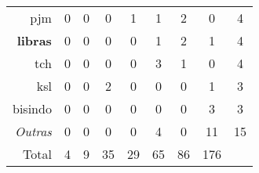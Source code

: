 \begin{table}[]
{\begin{tabular}{r|ccccccc|c}
        \acrshort{pjm}             & 0                         & 0                         & 0                          & \cellcolor[HTML]{FFFEFB}1  & \cellcolor[HTML]{FFFEFB}1  & \cellcolor[HTML]{FFFCF6}2  & 0                          & 4     \\
        \textbf{\acrshort{libras}} & 0                         & 0                         & 0                          & 0                          & \cellcolor[HTML]{FFFEFB}1  & \cellcolor[HTML]{FFFCF6}2  & \cellcolor[HTML]{FFFEFB}1  & 4     \\
        \acrshort{tch}             & 0                         & 0                         & 0                          & 0                          & \cellcolor[HTML]{FFFBF2}3  & 1                          & 0                          & 4     \\
        \acrshort{ksl}             & 0                         & 0                         & \cellcolor[HTML]{FFFCF6}2  & 0                          & 0                          & 0                          & \cellcolor[HTML]{FFFEFB}1  & 3     \\
        \acrshort{bisindo}         & 0                         & 0                         & 0                          & 0                          & 0                          & 0                          & \cellcolor[HTML]{FFFBF2}3  & 3     \\
        \textit{Outras}                             & 0                         & 0                         & 0                          & 0                          & \cellcolor[HTML]{FFF9EE}4  & 0                          & \cellcolor[HTML]{FFEFD0}11 & 15    \\ \hline
        Total                                       & 4                         & 9                         & 35                         & 29                         & 65                         & 86                         & 176                        &       \\ \hline
        \end{tabular}%
        }
\end{table}